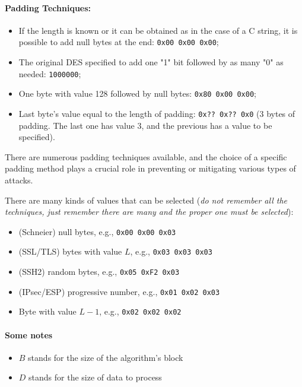\paragraph*{Padding Techniques:}
\begin{itemize}
    \item If the length is known or it can be obtained as in the case of a C string, it is possible to add null bytes
    at the end: \texttt{0x00 0x00 0x00};
    \item The original DES specified to add one "1" bit followed by as many "0" as needed: \texttt{1000000};
    \item One byte with value 128 followed by null bytes: \texttt{0x80 0x00 0x00};
    \item Last byte's value equal to the length of padding: \texttt{0x?? 0x?? 0x0} (3 bytes of padding. The last one
    has value 3, and the previous has a value to be specified).
\end{itemize}

There are numerous padding techniques available, and the choice of a specific padding method plays a crucial role in preventing or mitigating various types of attacks. 

There are many kinds of values that can be selected (\textit{do not remember all the techniques, just remember there
are many and the proper one must be selected}):

\begin{itemize}
    \item (Schneier) null bytes, e.g., \texttt{0x00 0x00 0x03}
    \item (SSL/TLS) bytes with value $L$, e.g., \texttt{0x03 0x03 0x03}
    \item (SSH2) random bytes, e.g., \texttt{0x05 0xF2 0x03}
    \item (IPsec/ESP) progressive number, e.g., \texttt{0x01 0x02 0x03}
    \item Byte with value $L-1$, e.g., \texttt{0x02 0x02 0x02}
\end{itemize}


\paragraph*{Some notes}
\begin{itemize}
    \item $B$ stands for the size of the algorithm's block
    \item $D$ stands for the size of data to process
\end{itemize}

